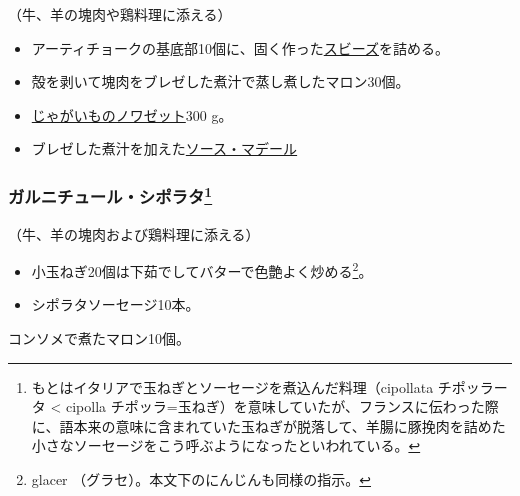 \begin{recette}


（牛、羊の塊肉や鶏料理に添える）

\begin{itemize}
\item
  アーティチョークの基底部10個に、固く作った\protect\hyperlink{sauce-soubise}{スビーズ}を詰める。
\item
  殻を剥いて塊肉をブレゼした煮汁で蒸し煮したマロン30個。
\item
  \protect\hyperlink{pommes-de-terre-noisette}{じゃがいものノワゼット}300
  g。
\item
  ブレゼした煮汁を加えた\protect\hyperlink{sauce-madere}{ソース・マデール}
\end{itemize}

\hypertarget{garniture-chipolata}{%
\subsubsection[ガルニチュール・シポラタ]{\texorpdfstring{ガルニチュール・シポラタ\footnote{もとはイタリアで玉ねぎとソーセージを煮込んだ料理（cipollata
  チポッラータ \textless{} cipolla
  チポッラ=玉ねぎ）を意味していたが、フランスに伝わった際に、語本来の意味に含まれていた玉ねぎが脱落して、羊腸に豚挽肉を詰めた小さなソーセージをこう呼ぶようになったといわれている。}}{ガルニチュール・シポラタ}}\label{garniture-chipolata}}



（牛、羊の塊肉および鶏料理に添える）

\begin{itemize}
\item
  小玉ねぎ20個は下茹でしてバターで色艶よく炒める\footnote{glacer
    （グラセ）。本文下のにんじんも同様の指示。}。
\item
  シポラタソーセージ10本。
\end{itemize}

コンソメで煮たマロン10個。


\end{recette}
